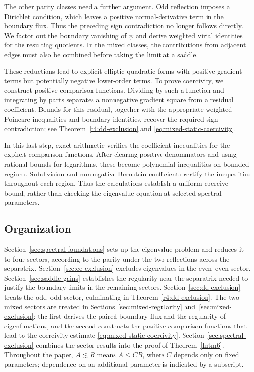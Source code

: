 \documentclass[reqno,11pt]{amsart}
\numberwithin{equation}{section}
\theoremstyle{remark}
\begin{document}
The other parity classes need a further
argument. Odd reflection imposes a Dirichlet condition,
which leaves a positive normal-derivative term in the
boundary flux. Thus the preceding sign contradiction no
longer follows directly. We factor out the boundary
vanishing of $\psi$ and derive weighted virial identities
for the resulting quotients. In the mixed classes,
the contributions from adjacent edges must also be
combined before taking the limit at a saddle.

These reductions lead to explicit elliptic quadratic
forms with positive gradient terms but potentially
negative lower-order terms. To prove coercivity, we
construct positive comparison functions. Dividing by
such a function and integrating by parts separates a
nonnegative gradient square from a residual coefficient.
Bounds for this residual, together with the appropriate
weighted Poincare inequalities and boundary identities,
recover the required sign contradiction; see
Theorem~\ref{r4:dd-exclusion} and
\eqref{eq:mixed-static-coercivity}.

In this last step, exact arithmetic verifies the
coefficient inequalities for the explicit comparison
functions. After clearing positive denominators and
using rational bounds for logarithms, these become
polynomial inequalities on bounded regions.
Subdivision and nonnegative Bernstein coefficients
certify the inequalities throughout each region.
Thus the calculations establish a uniform coercive
bound, rather than checking the eigenvalue equation
at selected spectral parameters.

\subsection{Organization}
Section~\ref{sec:spectral-foundations} sets up the eigenvalue problem
and reduces it to four sectors, according to the parity under the two
reflections across the separatrix. Section~\ref{sec:ee-exclusion}
excludes eigenvalues in the even--even sector.
Section~\ref{sec:saddle-gains} establishes the regularity near the
separatrix needed to justify the boundary limits in the remaining
sectors. Section~\ref{sec:dd-exclusion} treats the odd--odd sector,
culminating in Theorem~\ref{r4:dd-exclusion}. The two mixed sectors
are treated in Sections~\ref{sec:mixed-regularity}
and~\ref{sec:mixed-exclusion}: the first derives the paired boundary
flux and the regularity of eigenfunctions, and the second constructs
the positive comparison functions that lead to the coercivity estimate
\eqref{eq:mixed-static-coercivity}. Section~\ref{sec:spectral-exclusion}
combines the sector results into the proof of Theorem~\ref{Intm6}.
Throughout the paper, $A\lesssim B$ means $A\le CB$, where $C$
depends only on fixed parameters; dependence on an additional
parameter is indicated by a subscript.
\end{document}
